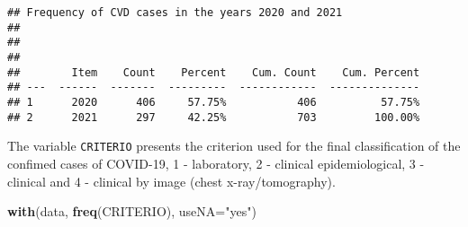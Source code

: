 \documentclass[
]{article}
\newenvironment{Shaded}{\begin{snugshade}}{\end{snugshade}}
\newcommand{\AttributeTok}[1]{\textcolor[rgb]{0.13,0.29,0.53}{#1}}
\newcommand{\ConstantTok}[1]{\textcolor[rgb]{0.56,0.35,0.01}{#1}}
\newcommand{\DocumentationTok}[1]{\textcolor[rgb]{0.56,0.35,0.01}{\textbf{\textit{#1}}}}
\newcommand{\FunctionTok}[1]{\textcolor[rgb]{0.13,0.29,0.53}{\textbf{#1}}}
\newcommand{\NormalTok}[1]{#1}
\newcommand{\OtherTok}[1]{\textcolor[rgb]{0.56,0.35,0.01}{#1}}
\newcommand{\SpecialCharTok}[1]{\textcolor[rgb]{0.81,0.36,0.00}{\textbf{#1}}}
\newcommand{\StringTok}[1]{\textcolor[rgb]{0.31,0.60,0.02}{#1}}
\begin{document}
\begin{Shaded}
\end{Shaded}

\begin{verbatim}
## Frequency of CVD cases in the years 2020 and 2021 
## 
## 
## 
##        Item    Count    Percent    Cum. Count    Cum. Percent
## ---  ------  -------  ---------  ------------  --------------
## 1      2020      406     57.75%           406          57.75%
## 2      2021      297     42.25%           703         100.00%
\end{verbatim}

The variable \texttt{CRITERIO} presents the criterion used for the final
classification of the confimed cases of COVID-19, 1 - laboratory, 2 -
clinical epidemiological, 3 - clinical and 4 - clinical by image (chest
x-ray/tomography).

\begin{Shaded}
\begin{Highlighting}[]
\FunctionTok{with}\NormalTok{(data, }\FunctionTok{freq}\NormalTok{(CRITERIO), }\AttributeTok{useNA=}\StringTok{"yes"}\NormalTok{)}
\end{Highlighting}
\end{Shaded}
\end{document}
